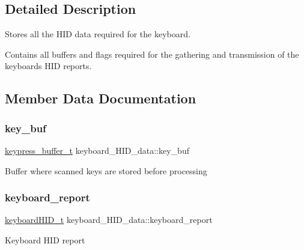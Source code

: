 \subsection{Detailed Description}
Stores all the H\+ID data required for the keyboard. 

Contains all buffers and flags required for the gathering and transmission of the keyboard\textquotesingle{}s H\+ID reports. 

\subsection{Member Data Documentation}
\mbox{\label{structkeyboard__HID__data_a7f833c96a3af819be19cd72b5a92e39a}} 
\subsubsection{\texorpdfstring{key\+\_\+buf}{key\_buf}}
{\footnotesize\ttfamily \hyperlink{keyboard_8h_ab586bec625b4d7aa91ae837cd567b247}{keypress\+\_\+buffer\+\_\+t} keyboard\+\_\+\+H\+I\+D\+\_\+data\+::key\+\_\+buf}

Buffer where scanned keys are stored before processing \mbox{\label{structkeyboard__HID__data_a00c66ed8ebc503cf1266ff8261f64d0c}} 
\subsubsection{\texorpdfstring{keyboard\+\_\+report}{keyboard\_report}}
{\footnotesize\ttfamily \hyperlink{keyboard_8h_ae1e2d2809df85854a9c34195cd7be87b}{keyboard\+H\+I\+D\+\_\+t} keyboard\+\_\+\+H\+I\+D\+\_\+data\+::keyboard\+\_\+report}

Keyboard H\+ID report \mbox{\label{structkeyboard__HID__data_a5cc61600ba30d39b829d21187d97c74c}} 
